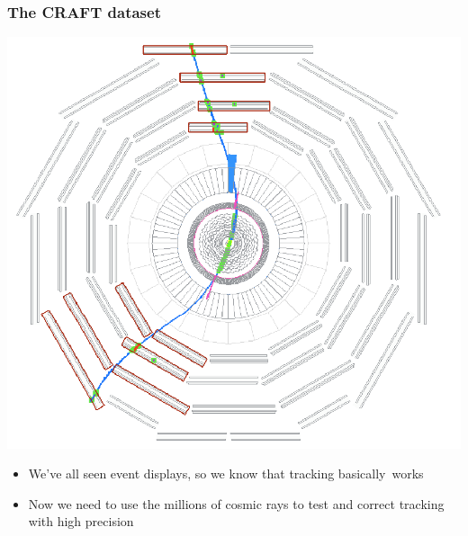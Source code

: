\documentclass[compress]{beamer}
\begin{document}
\begin{frame}
\frametitle{The CRAFT dataset}

\begin{center}
\includegraphics[width=0.5\linewidth]{event_display.png}
\end{center}

\begin{itemize}
\item We've all seen event displays, so we know that tracking \mbox{basically works\hspace{-1 cm}}
\item Now we need to use the millions of cosmic rays to test and correct tracking with high precision
\end{itemize}
\end{frame}
\end{document}

